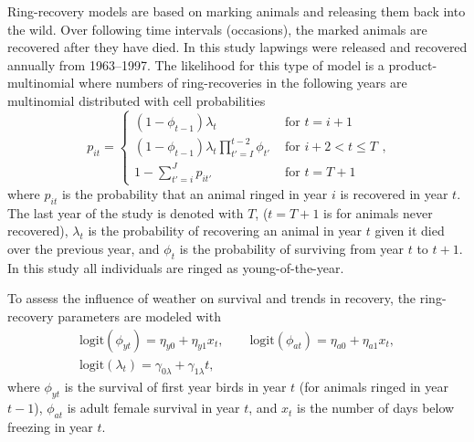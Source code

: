 \documentclass[12pt]{article}
\begin{document}
Ring-recovery models are based on marking animals and releasing them back into the wild. Over following time intervals (occasions), the marked animals are recovered after they have died. In this study lapwings were released and recovered annually from 1963--1997. The likelihood for this type of model is a product-multinomial where numbers of ring-recoveries in the following years are multinomial distributed with cell probabilities
\[
p_{it} = \left\{ 
\begin{array}{ll}
(1-\phi_{t-1})\lambda_t & \text{ for } t=i+1 \\
(1-\phi_{t-1})\lambda_t\prod_{t'=I}^{t-2} \phi_{t'} & \text{ for } i+2 < t \le T \\
1-\sum_{t'=i}^J p_{it'} & \text{ for } t=T+1
\end{array} \right. ,
\]
where $p_{it}$ is the probability that an animal ringed in year $i$ is recovered in year $t$. The last year of the study is denoted with $T$, ($t=T+1$ is for animals never recovered), $\lambda_t$ is the probability of recovering an animal in year $t$ given it died over the previous year, and $\phi_t$ is the probability of surviving from year $t$ to $t+1$. In this study all individuals are ringed as young-of-the-year. 

To assess the influence of weather on survival and trends in recovery, the ring-recovery parameters are modeled with 
\begin{equation}
\begin{gathered}
\text{logit}(\phi_{yt}) = \eta_{y0} + \eta_{y1} x_t,\qquad \text{logit}(\phi_{at}) = \eta_{a0}+ \eta_{a1} x_t,\\
\text{logit}(\lambda_t) = \gamma_{0\lambda} + \gamma_{1\lambda} t,
\end{gathered}
\end{equation}
where $\phi_{yt}$ is the survival of first year birds in year $t$ (for animals ringed in year $t-1$), $\phi_{at}$ is adult female survival in year $t$, and $x_t$ is the number of days below freezing in year $t$. 
\end{document}
